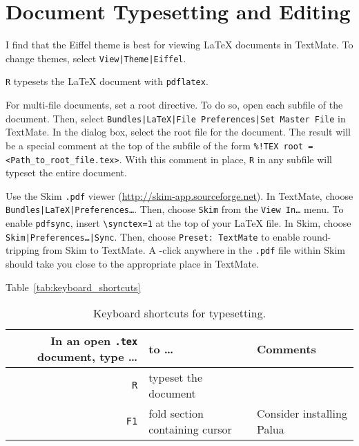 \documentclass[10pt]{article}
\begin{document}
\section{Document Typesetting and Editing} %
\label{sec:document_typesetting}
I find that the Eiffel theme is best for viewing \LaTeX{} documents in TextMate. 
To change themes, select \texttt{View|Theme|Eiffel}.

\cmdkey\texttt{R} typesets the \LaTeX{} document with \texttt{pdflatex}. 

For multi-file documents, set a root directive.
To do so, open each subfile of the document. 
Then, select \texttt{Bundles|LaTeX|File Preferences|Set Master File} in TextMate.
In the dialog box, select the root file for the document. 
The result will be a special comment at the top of the subfile of the form
\verb&%!TEX root = <Path_to_root_file.tex>&.
With this comment in place, \cmdkey\texttt{R} in any subfile will typeset the entire document.

Use the Skim \texttt{.pdf} viewer (\url{http://skim-app.sourceforge.net}).
In TextMate, choose \texttt{Bundles|LaTeX|Preferences\dots}.
Then, choose \texttt{Skim} from the \texttt{View In\dots} menu.
To enable \texttt{pdfsync}, insert \verb!\synctex=1! 
at the top of your \LaTeX{} file.
In Skim, choose \texttt{Skim|Preferences\dots|Sync}. 
Then, choose \texttt{Preset:~TextMate} to enable round-tripping from Skim to TextMate. 
A \cmdkey\shiftkey-click anywhere in the \texttt{.pdf} file within Skim 
should take you close to the appropriate place in TextMate.

Table~\ref{tab:keyboard_shortcuts}

\begin{table}
\centering
\caption{Keyboard shortcuts for typesetting.}
\begin{tabular}{r|l|l}
	In an open \texttt{.tex} document, type \dots & to \dots      & Comments                  \\
	\hline
	\cmdkey\texttt{R}           & typeset the document            &                           \\
	\texttt{F1}                 & fold section containing cursor  & Consider installing Palua \\ 
	
\end{tabular}
\label{tab:typesetting_keyboard_shortcuts}
\end{table}

\end{document}
